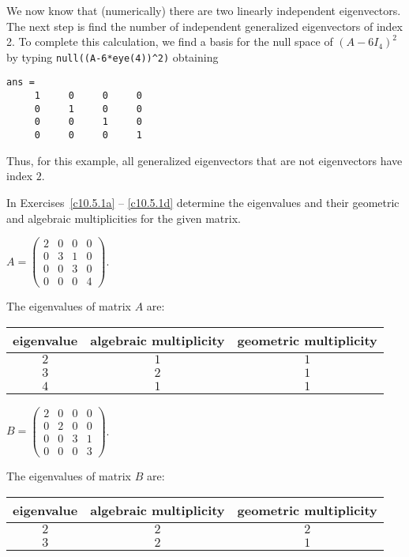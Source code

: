 \documentclass{ximera}
\begin{document}
We now know that (numerically) there are two linearly independent
eigenvectors.  The next step is find the number of independent generalized 
eigenvectors of index 2.  To complete this calculation, we find 
a basis for the null space of $(A-6I_4)^2$ by typing 
{\tt null((A-6*eye(4))\^{ }2)} obtaining
\begin{verbatim}
ans =
     1     0     0     0
     0     1     0     0
     0     0     1     0
     0     0     0     1
\end{verbatim}
Thus, for this example, all generalized eigenvectors that are not
eigenvectors have index $2$.

\EXER

\TEXER

\noindent In Exercises~\ref{c10.5.1a} -- \ref{c10.5.1d} determine the 
eigenvalues and their geometric and algebraic multiplicities for the 
given matrix.
\begin{exercise} \label{c10.5.1a}
$A = \left(\begin{array}{cccc} 2 & 0 &  0 & 0\\ 0 & 3 & 1 & 0 \\
0 & 0 & 3 & 0 \\ 0 & 0 & 0 & 4 \end{array}\right)$.

\begin{solution}
The eigenvalues of matrix $A$ are:
\begin{center}
\begin{tabular}{|c|c|c|}
\hline
eigenvalue & algebraic multiplicity & geometric multiplicity \\
\hline
$2$ & $1$ & $1$ \\
$3$ & $2$ & $1$ \\
$4$ & $1$ & $1$ \\
\hline
\end{tabular}
\end{center}


\end{solution}
\end{exercise}
\begin{exercise} \label{c10.5.1b}
$B = \left(\begin{array}{cccc} 2 & 0 &  0 & 0\\ 0 & 2 & 0 & 0 \\
0 & 0 & 3 & 1 \\ 0 & 0 & 0 & 3 \end{array}\right)$.

\begin{solution}
The eigenvalues of matrix $B$ are:
\begin{center}
\begin{tabular}{|c|c|c|}
\hline
eigenvalue & algebraic multiplicity & geometric multiplicity \\
\hline
$2$ & $2$ & $2$ \\
$3$ & $2$ & $1$ \\
\hline
\end{tabular}
\end{center}

\end{solution}
\end{exercise}
\end{document}
